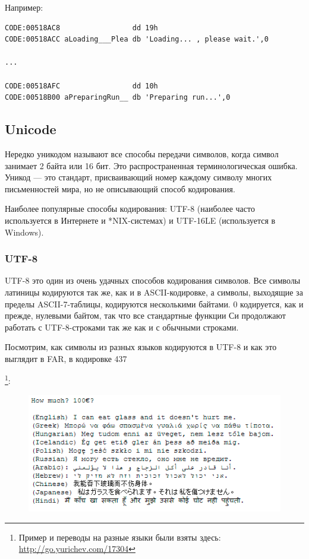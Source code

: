 Например:

\begin{lstlisting}[caption=Delphi]
CODE:00518AC8                 dd 19h
CODE:00518ACC aLoading___Plea db 'Loading... , please wait.',0

...

CODE:00518AFC                 dd 10h
CODE:00518B00 aPreparingRun__ db 'Preparing run...',0
\end{lstlisting}

\subsection{Unicode}

Нередко уникодом называют все способы передачи символов, когда символ занимает 2 байта или 16 бит.
Это распространенная терминологическая ошибка.
Уникод --- это стандарт, присваивающий номер каждому символу многих письменностей мира, но не описывающий
способ кодирования.

Наиболее популярные способы кодирования: 
UTF-8 (наиболее часто используется в Интернете и *NIX-системах) и UTF-16LE (используется в Windows).

\subsubsection{UTF-8}

UTF-8 это один из очень удачных способов кодирования символов.
Все символы латиницы кодируются так же, как и в ASCII-кодировке, а символы, выходящие за пределы
ASCII-7-таблицы, кодируются несколькими байтами.
0 кодируется, как и прежде, нулевыми байтом, так что все стандартные
функции Си продолжают работать с UTF-8-строками так же как и с обычными строками.

Посмотрим, как символы из разных языков кодируются в UTF-8 и как это выглядит в FAR, в кодировке 437

\footnote{Пример и переводы на разные языки были взяты здесь: 
\url{http://go.yurichev.com/17304}}:

\begin{figure}[H]
\centering
\includegraphics[scale=\NormalScale]{digging_into_code/strings/multilang_sampler.png}
\end{figure}


